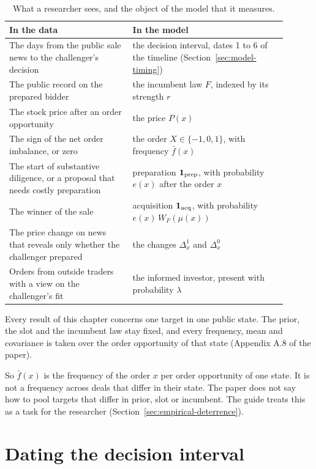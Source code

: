 \begin{table}[ht]
\centering\small
\caption{What a researcher sees, and the object of the model that it measures.}\label{tab:empirical-observe}
\begin{tabular}{@{}p{0.40\linewidth}p{0.50\linewidth}@{}}
\toprule
In the data & In the model\\
\midrule
The days from the public sale news to the challenger's decision & the decision interval, dates 1 to 6 of the timeline (Section~\ref{sec:model-timing})\\[2pt]
The public record on the prepared bidder & the incumbent law \(F\), indexed by its strength \(r\)\\[2pt]
The stock price after an order opportunity & the price \(P(x)\)\\[2pt]
The sign of the net order imbalance, or zero & the order \(X\in\{-1,0,1\}\), with frequency \(\bar f(x)\)\\[2pt]
The start of substantive diligence, or a proposal that needs costly preparation & preparation \(\mathbf{1}_{\rm prep}\), with probability \(e(x)\) after the order \(x\)\\[2pt]
The winner of the sale & acquisition \(\mathbf{1}_{\rm acq}\), with probability \(e(x)\,W_F(\mu(x))\)\\[2pt]
The price change on news that reveals only whether the challenger prepared & the changes \(\Delta^1_x\) and \(\Delta^0_x\)\\[2pt]
Orders from outside traders with a view on the challenger's fit & the informed investor, present with probability \(\lambda\)\\
\bottomrule
\end{tabular}
\end{table}

\begin{keyidea}
Every result of this chapter concerns one target in one public state. The prior, the slot and the incumbent law stay fixed, and every frequency, mean and covariance is taken over the order opportunity of that state (Appendix A.8 of the paper).
\end{keyidea}

So \(\bar f(x)\) is the frequency of the order \(x\) per order opportunity of one state. It is not a frequency across deals that differ in their state. The paper does not say how to pool targets that differ in prior, slot or incumbent. The guide treats this as a task for the researcher (Section~\ref{sec:empirical-deterrence}).

\section{Dating the decision interval}\label{sec:empirical-dating}

